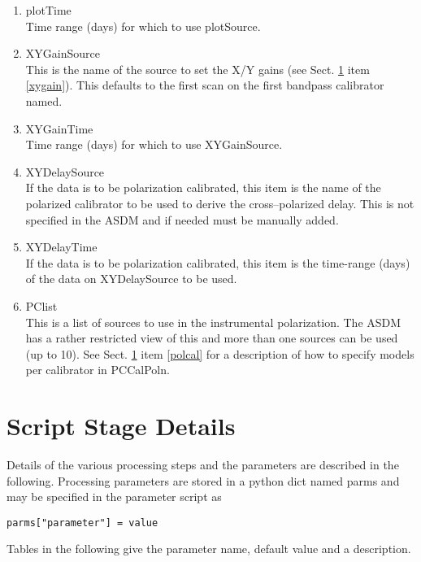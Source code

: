 \documentclass[11pt]{article}
\begin{document}
\begin{enumerate}
\item plotTime \\
Time range (days) for which to use plotSource.
\item XYGainSource \\
This is the name of the source to set the X/Y gains (see
Sect. \ref{Details} item \ref{xygain}).
This defaults to the first scan on the first bandpass calibrator named.
\item XYGainTime \\
Time range (days) for which to use XYGainSource.
\item XYDelaySource \\
If the data is to be polarization calibrated, this item is the name of
the polarized calibrator to be used to derive the cross--polarized
delay.
This is not specified in the ASDM and if needed must be manually added.
\item XYDelayTime \\
If the data is to be polarization calibrated, this item is the
time-range (days) of the data on XYDelaySource to be used.
\item PClist \\
This is a list of sources to use in the instrumental polarization.
The ASDM has a rather restricted view of this and more than one
sources can be used (up to 10).
See Sect. \ref{Details} item \ref{polcal} for a description of how to specify models per
calibrator in PCCalPoln. 
\end{enumerate}


\section{Script Stage Details}\label{Details}
Details of the various processing steps and the parameters are
described in the following.
Processing parameters are stored in a python dict named parms and may
be specified in the parameter script as
\begin{verbatim}
parms["parameter"] = value
\end{verbatim}
Tables in the following give the parameter name, default value and a
description.
\end{document}
